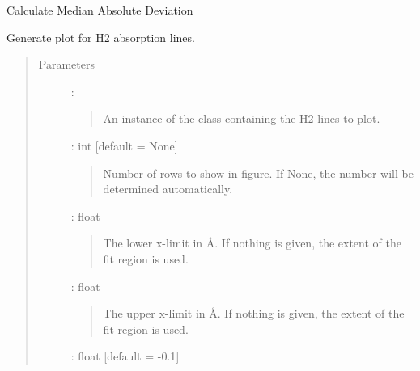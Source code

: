\documentclass[letterpaper,10pt,english]{sphinxmanual}
\begin{document}
\begin{fulllineitems}
\label{\detokenize{api:output.mad}}
Calculate Median Absolute Deviation

\end{fulllineitems}


\begin{fulllineitems}
\label{\detokenize{api:output.plot_H2}}
Generate plot for H2 absorption lines.
\begin{quote}\begin{description}
\item[{Parameters}] \leavevmode
{} : {\hyperref[\detokenize{api:VoigtFit.DataSet}]{}}
\begin{quote}

An instance of the class {\hyperref[\detokenize{api:VoigtFit.DataSet}]{}} containing
the H2 lines to plot.
\end{quote}

 : int   {[}default = None{]}
\begin{quote}

Number of rows to show in figure.
If None, the number will be determined automatically.
\end{quote}

 : float
\begin{quote}

The lower x-limit in Å.
If nothing is given, the extent of the fit region is used.
\end{quote}

 : float
\begin{quote}

The upper x-limit in Å.
If nothing is given, the extent of the fit region is used.
\end{quote}

 : float   {[}default = -0.1{]}
\begin{quote}


\end{quote}
\end{description}
\end{quote}
\end{fulllineitems}
\end{document}
